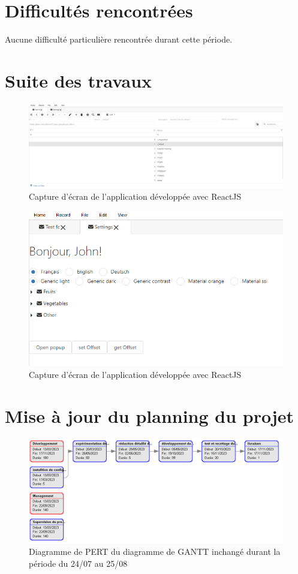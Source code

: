 \documentclass[a4paper, 12pt, french]{article}
\begin{document}
	\section{Difficultés rencontrées}
		Aucune difficulté particulière rencontrée durant cette période.

	\newpage
	
	\section{Suite des travaux}
		\begin{figure}[h!]
			\includegraphics[width=\linewidth]{mph_web_reactts_aout_1.png}
			\caption{Capture d'écran de l'application développée avec ReactJS}
		\end{figure}
		\begin{figure}[h!]
			\includegraphics[width=\linewidth]{mph_web_reactts_aout_2.png}
			\caption{Capture d'écran de l'application développée avec ReactJS}
		\end{figure}

	\newpage

	\section{Mise à jour du planning du projet}
		\begin{figure}[h!]
			\includegraphics[width=\linewidth]{gantt_13_04_13_05.png}
			\caption{Diagramme de PERT du diagramme de GANTT inchangé durant la période du 24/07 au 25/08}
		\end{figure}
		
		
\end{document}

